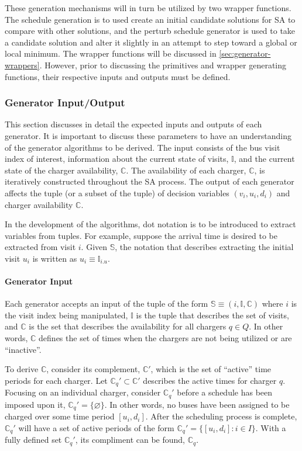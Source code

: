 \documentclass[11pt,a4paper,final]{article}
\newcommand{\I}{\mathbb{I}}                 %
\newcommand{\C}{\mathbb{C}}                 %
\newcommand{\Sol}{\mathbb{S}}               %
\newcommand{\Qset}{Q}                       %
\begin{document}
These generation mechanisms will in turn be utilized by two wrapper functions. The schedule generation is to used create
an initial candidate solutions for SA to compare with other solutions, and the perturb schedule generator is used to
take a candidate solution and alter it slightly in an attempt to step toward a global or local minimum. The wrapper
functions will be discussed in \ref{sec:generator-wrappers}. However, prior to discussing the primitives and wrapper
generating functions, their respective inputs and outputs must be defined.

\subsubsection{Generator Input/Output}
\label{sec:generator-input-output}
This section discusses in detail the expected inputs and outputs of each generator. It is important to discuss these
parameters to have an understanding of the generator algorithms to be derived. The input consists of the bus visit index
of interest, information about the current state of visits, \(\I\), and the current state of the charger availability,
\(\C\). The availability of each charger, \(\C\), is iteratively constructed throughout the SA process. The output of each
generator affects the tuple (or a subset of the tuple) of decision variables \((v_i, u_i, d_i)\) and charger availability
\(\C\).

In the development of the algorithms, dot notation is to be introduced to extract variables from tuples. For example,
suppose the arrival time is desired to be extracted from visit \(i\). Given \(\Sol\), the notation that describes extracting
the initial visit \(u_i\) is written as \(u_i \equiv \I_{i.u}\).

\paragraph{Generator Input}
\label{sec:org766ef57}
Each generator accepts an input of the tuple of the form \(\Sol \equiv (i, \I, \C)\) where \(i\) is the visit index being
manipulated, \(\I\) is the tuple that describes the set of visits, and \(\C\) is the set that describes the availability for
all chargers \(q \in \Qset\). In other words, \(\C\) defines the set of times when the chargers are not being utilized or are
``inactive''.

To derive \(\C\), consider its complement, \(\C'\), which is the set of ``active'' time periods for each charger. Let \(\C_q' \subset
\C'\) describes the active times for charger \(q\). Focusing on an individual charger, consider \(\C_q'\) before a schedule
has been imposed upon it, \(\C_q' = \{ \varnothing \}\). In other words, no buses have been assigned to be charged over
some time period \([u_i, d_i]\). After the scheduling process is complete, \(\C_q'\) will have a set of active periods of
the form \(\C_q' = \{[u_i, d_i]: i \in I\}\). With a fully defined set \(\C_q'\), its compliment can be found, \(\C_q\).
\end{document}
